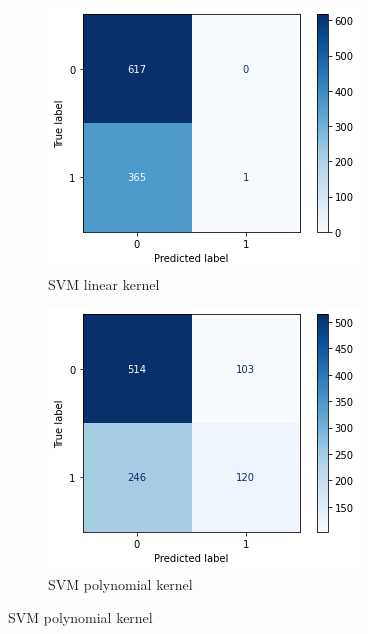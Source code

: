 \documentclass{article}
\begin{document}
\begin{figure}[!h]
	\centering
	\begin{subfigure}[b]{0.25\textwidth}
		\centering
		\includegraphics[width=\textwidth]{../images/cmatrix-svm-linear}
		\caption*{SVM linear kernel}
		\label{fig:knn}
	\end{subfigure}
	\hfill
	\begin{subfigure}[b]{0.25\textwidth}
		\centering
		\includegraphics[width=\textwidth]{../images/cmatrix-svm-poly}
		\caption*{SVM polynomial kernel}

\end{subfigure}
\end{figure}
\end{document}
